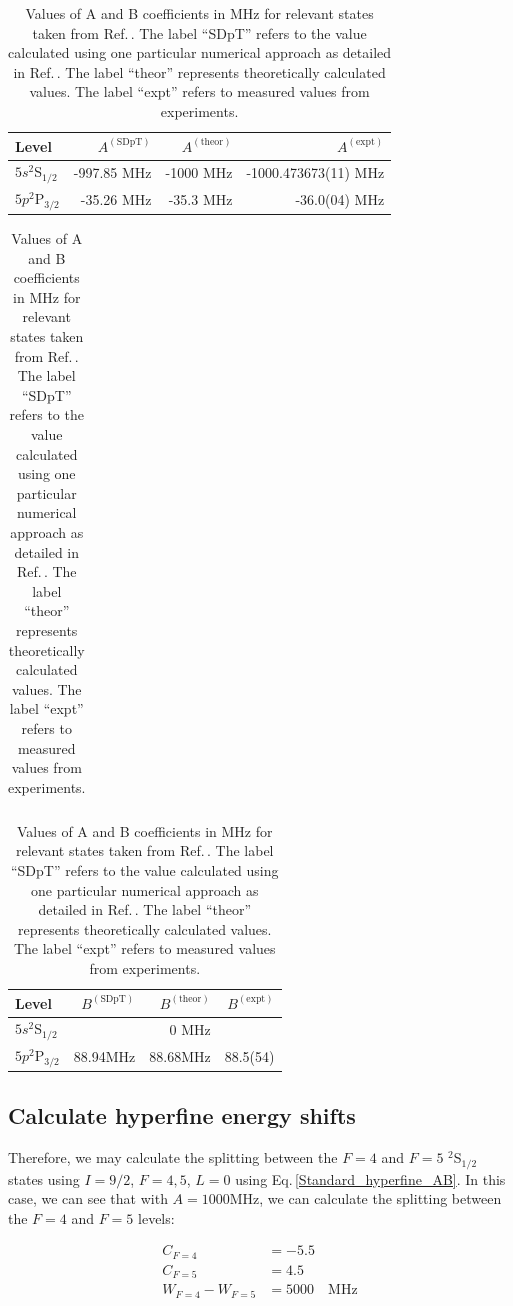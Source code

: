 \begin{table}[h]
\centering
\begin{tabular}{|l|r|r|r|}
\hline
Level &  $A^{\mathrm{(SDpT)}}$ &$A^{\mathrm{(theor)}}$ & $A^{\mathrm{(expt)}}$ \\ \hline \hline
$5s ^2$S$_{1/2}$&-997.85 MHz& -1000 MHz& -1000.473673(11) MHz\\ \hline
$5p ^2$P$_{3/2}$&-35.26 MHz&-35.3 MHz&-36.0(04) MHz\\ \hline
\end{tabular}

\begin{tabular}{l}
\end{tabular}

\begin{tabular}{|l|r|r|r|}
\hline
Level &  $B^{\mathrm{(SDpT)}}$ &$B^{\mathrm{(theor)}}$ & $B^{\mathrm{(expt)}}$ \\ \hline \hline
$5s ^2$S$_{1/2}$&&0  MHz&  \\ \hline
$5p ^2$P$_{3/2}$&88.94MHz&$88.68$MHz\footnotemark&88.5(54) \\ \hline
\end{tabular}
\caption{Values of A and B coefficients in MHz for relevant states taken from Ref.\,\cite{safronova2photon}. The label ``SDpT'' refers to the value calculated using one particular numerical approach as detailed in Ref.\,\cite{safronova2photon}. The label ``theor'' represents theoretically calculated values. The label ``expt'' refers to measured values from experiments.\label{AB_table}
}
\end{table}

\subsection{Calculate hyperfine energy shifts}
Therefore, we may calculate the splitting between the $F=4$ and $F=5$ $^2$S$_{1/2}$ states using $I=9/2$, $F=4,5$, $L=0$ using Eq.\,\ref{Standard_hyperfine_AB}. In this case, we can see that with $A=1000$MHz, we can calculate the splitting between the $F=4$ and $F=5$ levels: 

\begin{align}
C_{F=4} &= -5.5\\
C_{F=5} &= 4.5\\
W_{F=4}-W_{F=5}&=5000 \quad \mathrm{MHz}
\end{align}

